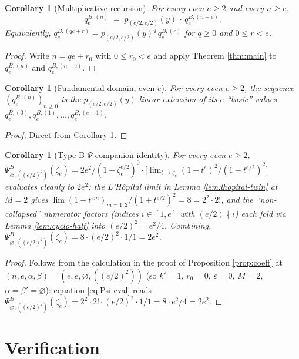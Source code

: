 \documentclass[11pt]{article}
\newtheorem{corollary}[theorem]{Corollary}
\theoremstyle{definition}
\theoremstyle{remark}
\newcommand{\zetae}{\zeta_e}
\newcommand{\emptyy}{\varnothing}
\newcommand{\PsiB}{\Psi^{B}}
\newcommand{\eps}{\varepsilon}
\begin{document}
\begin{corollary}[Multiplicative recursion]\label{cor:recursion}
For every even $e \ge 2$ and every $n \ge e$,
\[
  q_e^{B, (n)} \;=\; p_{(e/2, e/2)}(y)\, \cdot\, q_e^{B, (n - e)}.
\]
Equivalently, $q_e^{B, (q e + r)} = p_{(e/2, e/2)}(y)^{q}\, q_e^{B, (r)}$ for $q \ge 0$ and $0 \le r < e$.
\end{corollary}

\begin{proof}
Write $n = q e + r_0$ with $0 \le r_0 < e$ and apply Theorem \ref{thm:main} to $q_e^{B, (n)}$ and $q_e^{B, (n-e)}$.
\end{proof}

\begin{corollary}[Fundamental domain, even $e$]\label{cor:fund-domain}
For every even $e \ge 2$, the sequence $(q_e^{B, (n)})_{n \ge 0}$ is the $p_{(e/2, e/2)}(y)$-linear extension of its $e$ ``basic'' values $q_e^{B, (0)}, q_e^{B, (1)}, \ldots, q_e^{B, (e-1)}$.
\end{corollary}

\begin{proof}
Direct from Corollary \ref{cor:recursion}.
\end{proof}

\begin{corollary}[Type-B $\Psi$-companion identity]\label{cor:companion}
For every even $e \ge 2$, $\PsiB_{\emptyy, ((e/2)^{2})}(\zetae) = 2 e^2 / (1 + \zetae^{e/2})^0 \cdot \bigl[\lim_{t \to \zetae}(1 - t^{e})^{2} / (1 + t^{e/2})^{2}\bigr]$ evaluates cleanly to $2 e^2$: the L'H\^opital limit in Lemma \ref{lem:lhopital-twin} at $M = 2$ gives $\lim (1 - t^{em})_{m=1,2} / (1 + t^{e/2})^2 = 8 = 2^2 \cdot 2!$, and the ``non-collapsed'' numerator factors (indices $i \in [1, e]$ with $(e/2) \nmid i$) each fold via Lemma \ref{lem:cyclo-half} into $(e/2)^2 = e^2/4$. Combining, $\PsiB_{\emptyy, ((e/2)^{2})}(\zetae) = 8 \cdot (e/2)^{2} \cdot 1 / 1 = 2 e^2$.
\end{corollary}

\begin{proof}
Follows from the calculation in the proof of Proposition \ref{prop:coeff} at $(n, e, \alpha, \beta) = (e, e, \emptyy, ((e/2)^2))$ (so $k' = 1$, $r_0 = 0$, $\eps = 0$, $M = 2$, $\alpha = \beta' = \emptyy$): equation \eqref{eq:Psi-eval} reads $\PsiB_{\emptyy, ((e/2)^2)}(\zetae) = 2^2 \cdot 2! \cdot (e/2)^2 \cdot 1 / 1 = 8 \cdot e^2/4 = 2 e^2$.
\end{proof}

\section{Verification}\label{sec:verif}
\end{document}

